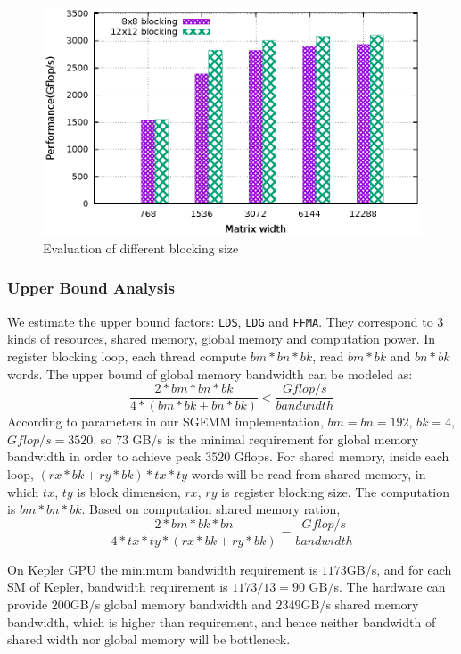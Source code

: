 \documentclass{sig-alternate-05-2015}
\begin{document}
\begin{figure}[htbp]
\begin{center}
\includegraphics[scale=0.6]{block}
    \caption{Evaluation of different blocking size}
\label{fig:block}
\end{center}
\end{figure}

\subsubsection{Upper Bound Analysis}
We estimate the upper bound factors: {\tt LDS}, {\tt LDG} and {\tt FFMA}. They correspond to $3$ kinds of resources, shared
memory, global memory and computation power. In register blocking loop, each thread compute $bm*bn*bk$, read $bm*bk$
and $bn*bk$ words. The upper bound of global memory bandwidth can be modeled as:
\begin{displaymath}
    \frac{2*bm*bn*bk}{4*(bm*bk + bn*bk)} < \frac{Gflop/s}{bandwidth}
\end{displaymath}
According to parameters in our SGEMM implementation, $bm=bn=192$, $bk=4$, $Gflop/s=3520$, so $73$ GB/s is the minimal
requirement for global memory bandwidth in order to achieve peak $3520$ Gflops.
For shared memory, inside each loop, $(rx*bk + ry * bk)*tx*ty$ words will be read from shared memory, in which $tx$,
$ty$ is block dimension, $rx$, $ry$ is register blocking size. The computation is $bm*bn*bk$. Based on computation
shared memory ration,
\begin{displaymath}
    \frac{2*bm*bk*bn}{4*tx*ty*(rx*bk + ry *bk)}  = \frac{Gflop/s}{bandwidth}
\end{displaymath}

On Kepler GPU the minimum bandwidth requirement is $1173$GB/s, and for each SM of Kepler, bandwidth requirement is
$1173/13=90$ GB/s.
The hardware can provide $200$GB/s global memory bandwidth and $2349$GB/s shared memory bandwidth, which is
higher than requirement, and hence neither bandwidth of shared width nor global memory will be bottleneck.
\end{document}
